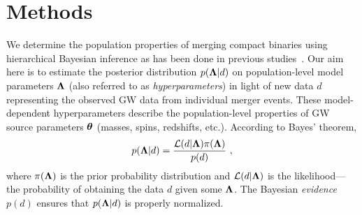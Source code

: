 \section{Methods}\label{sec:methods}

We determine the population properties of merging compact binaries using hierarchical Bayesian inference as has been done in previous studies~\citep{LIGOScientific:2018jsj,LIGOScientific:2020kqk,KAGRA:2021duu}. Our aim here is to estimate the posterior distribution $p(\boldsymbol{\Lambda}|d)$ on population-level model parameters $\boldsymbol{\Lambda}$ (also referred to as \textit{hyperparameters}) in light of new data $d$ representing the observed \ac{GW} data from individual merger events. These model-dependent hyperparameters describe the population-level properties of \ac{GW} source parameters $\boldsymbol{\theta}$ (masses, spins, redshifts, etc.).
According to Bayes' theorem,
\begin{equation}
    p(\boldsymbol{\Lambda} | d) = \frac{\mathcal{L}(d|\boldsymbol{\Lambda})\pi(\boldsymbol{\Lambda})}{p(d)} \ ,
    \label{eq:bayes_theorem}
\end{equation}
where $\pi(\boldsymbol{\Lambda})$ is the prior probability distribution and $\mathcal{L}(d|\boldsymbol{\Lambda})$ is the likelihood---the probability of obtaining the data $d$ given some $\boldsymbol{\Lambda}$. 
The Bayesian \textit{evidence} $p(d)$ ensures that $p(\boldsymbol{\Lambda} | d)$ is properly normalized.

